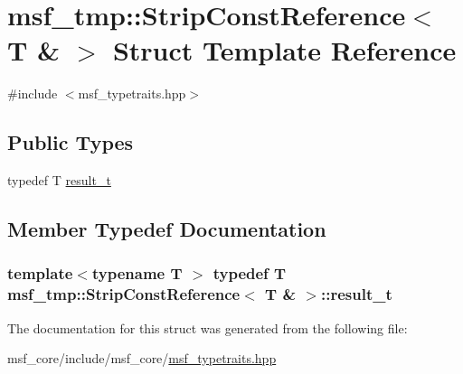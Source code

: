 \hypertarget{structmsf__tmp_1_1StripConstReference_3_01T_01_6_01_4}{\section{msf\-\_\-tmp\-:\-:Strip\-Const\-Reference$<$ T \& $>$ Struct Template Reference}
\label{structmsf__tmp_1_1StripConstReference_3_01T_01_6_01_4}
}


{\ttfamily \#include $<$msf\-\_\-typetraits.\-hpp$>$}

\subsection*{Public Types}
\begin{DoxyCompactItemize}
\item 
typedef T \hyperlink{structmsf__tmp_1_1StripConstReference_3_01T_01_6_01_4_ae467d3d062236fe36daa8c856cee2741}{result\-\_\-t}
\end{DoxyCompactItemize}


\subsection{Member Typedef Documentation}
\hypertarget{structmsf__tmp_1_1StripConstReference_3_01T_01_6_01_4_ae467d3d062236fe36daa8c856cee2741}{
\subsubsection[{result\-\_\-t}]{\setlength{\rightskip}{0pt plus 5cm}template$<$typename T $>$ typedef T {\bf msf\-\_\-tmp\-::\-Strip\-Const\-Reference}$<$ T \& $>$\-::{\bf result\-\_\-t}}}\label{structmsf__tmp_1_1StripConstReference_3_01T_01_6_01_4_ae467d3d062236fe36daa8c856cee2741}


The documentation for this struct was generated from the following file\-:\begin{DoxyCompactItemize}
\item 
msf\-\_\-core/include/msf\-\_\-core/\hyperlink{msf__typetraits_8hpp}{msf\-\_\-typetraits.\-hpp}\end{DoxyCompactItemize}
